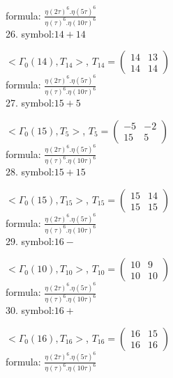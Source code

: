 formula: 
$ \frac{\eta(2\tau)^6 . \eta(5\tau)^6}{\eta(\tau)^6 . \eta(10\tau)^6} $
\\

26. symbol:$ 14+14 $

$ < \Gamma_0 ( 14 ), T_{14} >  $,
$
T_{14} = 
\left(
\begin{array}{cc}
14 & 13 \\
14 & 14
\end{array}
\right)
$
\\

formula: 
$ \frac{\eta(2\tau)^6 . \eta(5\tau)^6}{\eta(\tau)^6 . \eta(10\tau)^6} $
\\

27. symbol:$ 15+5 $

$ < \Gamma_0 ( 15 ), T_{5} >  $,
$
T_{5} = 
\left(
\begin{array}{cc}
-5 & -2 \\
15 & 5
\end{array}
\right)
$
\\

formula: 
$ \frac{\eta(2\tau)^6 . \eta(5\tau)^6}{\eta(\tau)^6 . \eta(10\tau)^6} $
\\

28. symbol:$ 15+15 $

$ < \Gamma_0 ( 15 ), T_{15} >  $,
$
T_{15} = 
\left(
\begin{array}{cc}
15 & 14 \\
15 & 15
\end{array}
\right)
$
\\

formula: 
$ \frac{\eta(2\tau)^6 . \eta(5\tau)^6}{\eta(\tau)^6 . \eta(10\tau)^6} $
\\

29. symbol:$ 16- $

$ < \Gamma_0 ( 10 ), T_{10} >  $,
$
T_{10} = 
\left(
\begin{array}{cc}
10 & 9 \\
10 & 10
\end{array}
\right)
$
\\

formula: 
$ \frac{\eta(2\tau)^6 . \eta(5\tau)^6}{\eta(\tau)^6 . \eta(10\tau)^6} $
\\

30. symbol:$ 16+ $

$ < \Gamma_0 ( 16 ), T_{16} >  $,
$
T_{16} = 
\left(
\begin{array}{cc}
16 & 15 \\
16 & 16
\end{array}
\right)
$
\\

formula: 
$ \frac{\eta(2\tau)^6 . \eta(5\tau)^6}{\eta(\tau)^6 . \eta(10\tau)^6} $
\\


